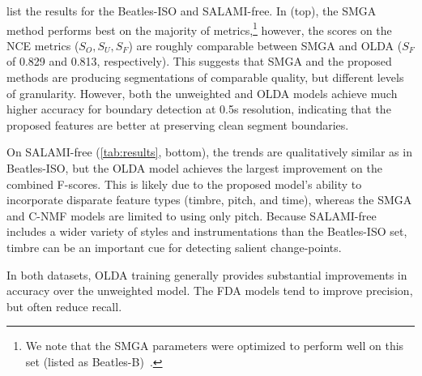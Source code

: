\documentclass{article}
\begin{document}


 list the results for the Beatles-ISO and SALAMI-free.
In  (top), the SMGA method performs best on the majority of metrics,\footnote{We
note that the SMGA parameters were optimized to perform well on this set (listed as
Beatles-B)~\cite{serra2012unsupervised}.}
however, the scores on the NCE metrics ($S_O, S_U, S_F$) are roughly comparable between SMGA and OLDA ($S_F$ of 0.829
and 0.813, respectively). 
This suggests that SMGA and the proposed methods are producing segmentations of comparable quality, but 
different levels of granularity.
However, both the unweighted and OLDA models achieve much higher accuracy for boundary detection at 0.5s resolution,
indicating that the proposed features are better at preserving clean segment boundaries.  

On SALAMI-free (\cref{tab:results}, bottom), the trends are qualitatively similar as in Beatles-ISO, but the OLDA
model achieves the largest improvement on the combined F-scores. This is likely due to the proposed model's
ability to incorporate disparate feature types (timbre, pitch, and time), whereas the SMGA and C-NMF models are
limited to using only pitch. 
Because SALAMI-free includes a wider variety of styles and instrumentations than the Beatles-ISO set, 
timbre can be an important cue for detecting salient change-points.

In both datasets, OLDA training generally provides substantial improvements in accuracy over the unweighted model. 
The FDA models tend to improve precision, but often reduce recall.
\end{document}
